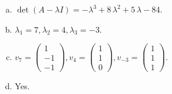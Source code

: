 \begin{questions}
\begin{solution}
\begin{enumerate}[(a)]
\item $\det(A-\lambda I)=-{\lambda}^{3} + 8 \, {\lambda}^{2} + 5 \, {\lambda} - 84$.
\item ${\lambda}_1=7, {\lambda}_2=4, {\lambda}_3=-3$.
\item $v_{7}=\left(\begin{array}{r}
1 \\
-1 \\
-1
\end{array}\right), v_{4}=\left(\begin{array}{r}
1 \\
1 \\
0
\end{array}\right), v_{-3}=\left(\begin{array}{r}
1 \\
1 \\
1
\end{array}\right)$.
\item Yes.
\end{enumerate}
\end{solution}

\end{questions}

\newpage


\begin{center}
\end{center}

